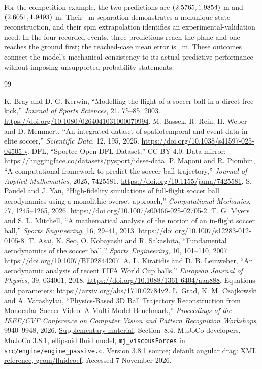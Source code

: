 \documentclass[12pt,letterpaper]{article}
\begin{document}
For the competition example, the two predictions are $(2.5765,1.9854)$ m and $(2.6051,1.9493)$ m. Their \GoalSeparation\ m separation demonstrates a nonunique state reconstruction, and their spin extrapolation identifies an experimental-validation need. In the four recorded events, three predictions reach the plane and one reaches the ground first; the reached-case mean error is \RealMeanError\ m. These outcomes connect the model's mechanical consistency to its actual predictive performance without imposing unsupported probability statements.

\begin{thebibliography}{99}
\raggedright
{} K. Bray and D. G. Kerwin, ``Modelling the flight of a soccer ball in a direct free kick,'' \emph{Journal of Sports Sciences}, 21, 75--85, 2003. \url{https://doi.org/10.1080/0264041031000070994}.
 M. Bassek, R. Rein, H. Weber and D. Memmert, ``An integrated dataset of spatiotemporal and event data in elite soccer,'' \emph{Scientific Data}, 12, 195, 2025. \url{https://doi.org/10.1038/s41597-025-04505-y}.
 DFL, ``Sportec Open DFL Dataset,'' CC BY 4.0. Data mirror: \url{https://huggingface.co/datasets/pysport/idsse-data}.
 P. Maponi and R. Piombin, ``A computational framework to predict the soccer ball trajectory,'' \emph{Journal of Applied Mathematics}, 2025, 7425581. \url{https://doi.org/10.1155/jama/7425581}.
 S. Paudel and J. Yan, ``High-fidelity simulations of full-flight soccer ball aerodynamics using a monolithic overset approach,'' \emph{Computational Mechanics}, 77, 1245--1265, 2026. \url{https://doi.org/10.1007/s00466-025-02705-2}.
 T. G. Myers and S. L. Mitchell, ``A mathematical analysis of the motion of an in-flight soccer ball,'' \emph{Sports Engineering}, 16, 29--41, 2013. \url{https://doi.org/10.1007/s12283-012-0105-8}.
 T. Asai, K. Seo, O. Kobayashi and R. Sakashita, ``Fundamental aerodynamics of the soccer ball,'' \emph{Sports Engineering}, 10, 101--110, 2007. \url{https://doi.org/10.1007/BF02844207}.
 A. L. Kiratidis and D. B. Leinweber, ``An aerodynamic analysis of recent FIFA World Cup balls,'' \emph{European Journal of Physics}, 39, 034001, 2018. \url{https://doi.org/10.1088/1361-6404/aaa888}. Equations and parameters: \url{https://arxiv.org/abs/1710.02784v2}.
 \L{}. Grad, K. M. Czajkowski and A. Varashylau, ``Physics-Based 3D Ball Trajectory Reconstruction from Monocular Soccer Video: A Multi-Model Benchmark,'' \emph{Proceedings of the IEEE/CVF Conference on Computer Vision and Pattern Recognition Workshops}, 9940--9948, 2026. \href{https://openaccess.thecvf.com/content/CVPR2026W/CVsports/supplemental/Grad_Physics-Based_3D_Ball_CVPRW_2026_supplemental.pdf}{Supplementary material}, Section~8.4.
 MuJoCo developers, MuJoCo 3.8.1, ellipsoid fluid model, \texttt{mj\_viscousForces} in \texttt{src/engine/engine\_passive.c}. \href{https://github.com/google-deepmind/mujoco/blob/3.8.1/src/engine/engine_passive.c}{Version 3.8.1 source}; default angular drag: \href{https://mujoco.readthedocs.io/en/stable/XMLreference.html#body-geom-fluidcoef}{XML reference, geom/fluidcoef}. Accessed 7 November 2026.
\end{thebibliography}
\end{document}
